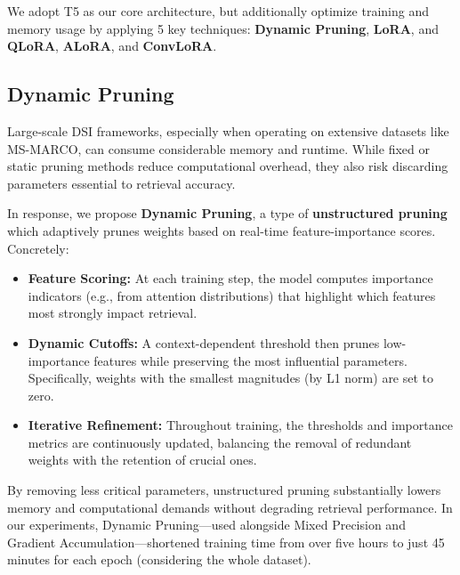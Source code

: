 We adopt T5 as our core architecture, but additionally optimize training and memory usage by applying 5 key techniques: \textbf{Dynamic Pruning}, \textbf{LoRA}\cite{hu2021loralowrankadaptationlarge}, and \textbf{QLoRA}\cite{dettmers2023qloraefficientfinetuningquantized}, \textbf{ALoRA}\cite{liu2024aloraallocatinglowrankadaptation}, and \textbf{ConvLoRA}\cite{aleem2024convloraadabnbaseddomain}. 

\subsection{Dynamic Pruning}
Large-scale DSI frameworks, especially when operating on extensive datasets like MS-MARCO\cite{bajaj2018msmarcohumangenerated}, can consume considerable memory and runtime. While fixed or static pruning methods reduce computational overhead, they also risk discarding parameters essential to retrieval accuracy.

In response, we propose \textbf{Dynamic Pruning}, a type of \textbf{unstructured pruning} which adaptively prunes weights based on real-time feature-importance scores. Concretely:
\begin{itemize}
    \item \textbf{Feature Scoring:} At each training step, the model computes importance indicators (e.g., from attention distributions) that highlight which features most strongly impact retrieval.
    \item \textbf{Dynamic Cutoffs:} A context-dependent threshold then prunes low-importance features while preserving the most influential parameters. Specifically, weights with the smallest magnitudes (by L1 norm) are set to zero.
    \item \textbf{Iterative Refinement:} Throughout training, the thresholds and importance metrics are continuously updated, balancing the removal of redundant weights with the retention of crucial ones.
\end{itemize}
By removing less critical parameters, unstructured pruning substantially lowers memory and computational demands without degrading retrieval performance. In our experiments, Dynamic Pruning—used alongside Mixed Precision and Gradient Accumulation—shortened training time from over five hours to just 45 minutes for each epoch (considering the whole dataset). 

